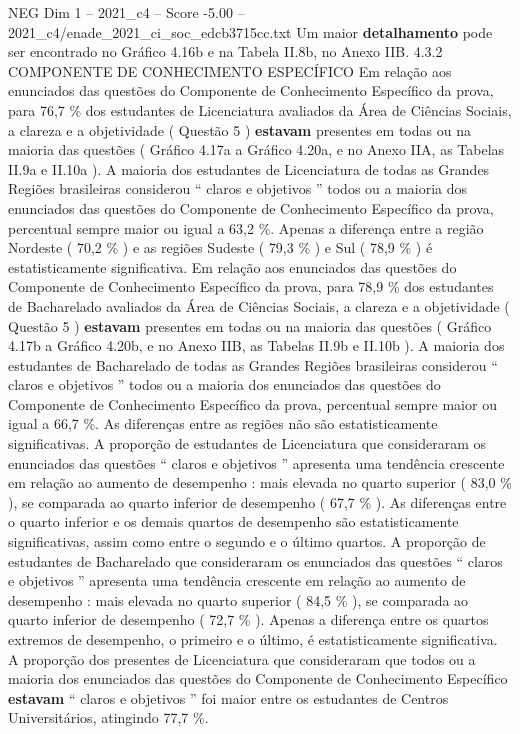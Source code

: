 \begin{textsample}{NEG Dim 1 – 2021\_c4 – Score -5.00 – 2021\_c4/enade\_2021\_ci\_soc\_edcb3715cc.txt}
Um maior \textbf{detalhamento} pode ser encontrado no Gráfico 4.16b e na Tabela II.8b, no Anexo IIB. 4.3.2 COMPONENTE DE CONHECIMENTO ESPECÍFICO Em relação aos enunciados das questões do Componente de Conhecimento Específico da prova, para 76,7 \% dos estudantes de Licenciatura avaliados da Área de Ciências Sociais, a clareza e a objetividade ( Questão 5 ) \textbf{estavam} presentes em todas ou na maioria das questões ( Gráfico 4.17a a Gráfico 4.20a, e no Anexo IIA, as Tabelas II.9a e II.10a ).
A maioria dos estudantes de Licenciatura de todas as Grandes Regiões brasileiras considerou “ claros e objetivos ” todos ou a maioria dos enunciados das questões do Componente de Conhecimento Específico da prova, percentual sempre maior ou igual a 63,2 \%.
Apenas a diferença entre a região Nordeste ( 70,2 \% ) e as regiões Sudeste ( 79,3 \% ) e Sul ( 78,9 \% ) é estatisticamente significativa.
Em relação aos enunciados das questões do Componente de Conhecimento Específico da prova, para 78,9 \% dos estudantes de Bacharelado avaliados da Área de Ciências Sociais, a clareza e a objetividade ( Questão 5 ) \textbf{estavam} presentes em todas ou na maioria das questões ( Gráfico 4.17b a Gráfico 4.20b, e no Anexo IIB, as Tabelas II.9b e II.10b ).
A maioria dos estudantes de Bacharelado de todas as Grandes Regiões brasileiras considerou “ claros e objetivos ” todos ou a maioria dos enunciados das questões do Componente de Conhecimento Específico da prova, percentual sempre maior ou igual a 66,7 \%.
As diferenças entre as regiões não são estatisticamente significativas.
A proporção de estudantes de Licenciatura que consideraram os enunciados das questões “ claros e objetivos ” apresenta uma tendência crescente em relação ao aumento de desempenho : mais elevada no quarto superior ( 83,0 \% ), se comparada ao quarto inferior de desempenho ( 67,7 \% ).
As diferenças entre o quarto inferior e os demais quartos de desempenho são estatisticamente significativas, assim como entre o segundo e o último quartos.
A proporção de estudantes de Bacharelado que consideraram os enunciados das questões “ claros e objetivos ” apresenta uma tendência crescente em relação ao aumento de desempenho : mais elevada no quarto superior ( 84,5 \% ), se comparada ao quarto inferior de desempenho ( 72,7 \% ).
Apenas a diferença entre os quartos extremos de desempenho, o primeiro e o último, é estatisticamente significativa.
A proporção dos presentes de Licenciatura que consideraram que todos ou a maioria dos enunciados das questões do Componente de Conhecimento Específico \textbf{estavam} “ claros e objetivos ” foi maior entre os estudantes de Centros Universitários, atingindo 77,7 \%.

\end{textsample}
